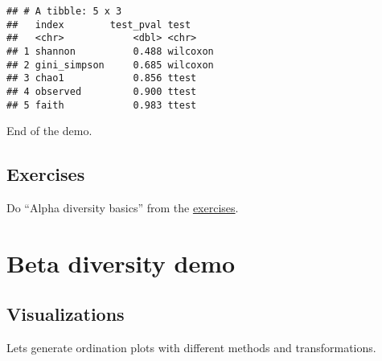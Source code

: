 \documentclass[
  oneside]{book}
\begin{document}
\begin{verbatim}
## # A tibble: 5 x 3
##   index        test_pval test    
##   <chr>            <dbl> <chr>   
## 1 shannon          0.488 wilcoxon
## 2 gini_simpson     0.685 wilcoxon
## 3 chao1            0.856 ttest   
## 4 observed         0.900 ttest   
## 5 faith            0.983 ttest
\end{verbatim}

End of the demo.

\hypertarget{exercises}{%
\section{Exercises}\label{exercises}}

Do ``Alpha diversity basics'' from the \href{https://microbiome.github.io/OMA/exercises.html}{exercises}.

\hypertarget{beta-diversity-demo}{%
\chapter{Beta diversity demo}\label{beta-diversity-demo}}

\hypertarget{visualizations}{%
\section{Visualizations}\label{visualizations}}

Lets generate ordination plots with different methods and transformations.
\end{document}
